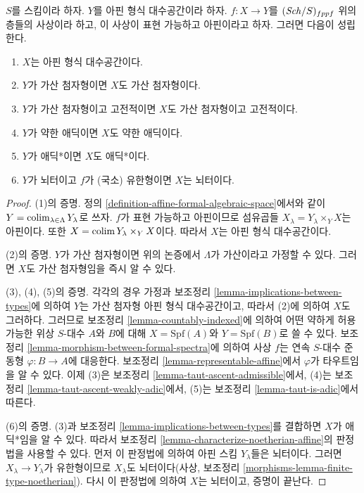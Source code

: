 \begin{lemma}
\label{lemma-property-goes-up-affine-morphism}
$S$를 스킴이라 하자. $Y$를 아핀 형식 대수공간이라 하자.
$f : X \to Y$를 $(\mathit{Sch}/S)_{fppf}$ 위의 층들의 사상이라 하고,
이 사상이 표현 가능하고 아핀이라고 하자. 그러면 다음이 성립한다.
\begin{enumerate}
\item $X$는 아핀 형식 대수공간이다.
\item $Y$가 가산 첨자형이면 $X$도 가산 첨자형이다.
\item $Y$가 가산 첨자형이고 고전적이면 $X$도 가산 첨자형이고
고전적이다.
\item $Y$가 약한 애딕이면 $X$도 약한 애딕이다.
\item $Y$가 애딕*이면 $X$도 애딕*이다.
\item $Y$가 뇌터이고 $f$가 (국소) 유한형이면 $X$는 뇌터이다.
\end{enumerate}
\end{lemma}

\begin{proof}
(1)의 증명. 정의 \ref{definition-affine-formal-algebraic-space}에서와
같이 $Y = \mathop{\mathrm{colim}}\nolimits_{\lambda \in \Lambda} Y_\lambda$로 쓰자.
$f$가 표현 가능하고 아핀이므로 섬유곱들
$X_\lambda = Y_\lambda \times_Y X$는 아핀이다. 또한 %
$X = \mathop{\mathrm{colim}}\nolimits Y_\lambda \times_Y X$이다.
따라서 $X$는 아핀 형식 대수공간이다.

\medskip\noindent
(2)의 증명. $Y$가 가산 첨자형이면 위의 논증에서 $\Lambda$가
가산이라고 가정할 수 있다. 그러면 $X$도 가산 첨자형임을 즉시
알 수 있다.

\medskip\noindent
(3), (4), (5)의 증명. 각각의 경우 가정과 보조정리
\ref{lemma-implications-between-types}에 의하여 $Y$는 가산 첨자형
아핀 형식 대수공간이고, 따라서 (2)에 의하여 $X$도 그러하다.
그러므로 보조정리 \ref{lemma-countably-indexed}에 의하여 어떤 약하게
허용 가능한 위상 $S$-대수 $A$와 $B$에 대해
$X = \text{Spf}(A)$와 $Y = \text{Spf}(B)$로 쓸 수 있다.
보조정리 \ref{lemma-morphism-between-formal-spectra}에 의하여 사상
$f$는 연속 $S$-대수 준동형 $\varphi : B \to A$에 대응한다.
보조정리 \ref{lemma-representable-affine}에서 $\varphi$가 타우트임을
알 수 있다. 이제 (3)은 보조정리
\ref{lemma-taut-ascent-admissible}에서, (4)는 보조정리
\ref{lemma-taut-ascent-weakly-adic}에서, (5)는 보조정리
\ref{lemma-taut-is-adic}에서 따른다.

\medskip\noindent
(6)의 증명. (3)과 보조정리 \ref{lemma-implications-between-types}를
결합하면 $X$가 애딕*임을 알 수 있다. 따라서 보조정리
\ref{lemma-characterize-noetherian-affine}의 판정법을 사용할 수 있다.
먼저 이 판정법에 의하여 아핀 스킴 $Y_\lambda$들은 뇌터이다.
그러면 $X_\lambda \to Y_\lambda$가 유한형이므로 $X_\lambda$도
뇌터이다(사상, 보조정리
\ref{morphisms-lemma-finite-type-noetherian}). 다시 이 판정법에
의하여 $X$는 뇌터이고, 증명이 끝난다.
\end{proof}

